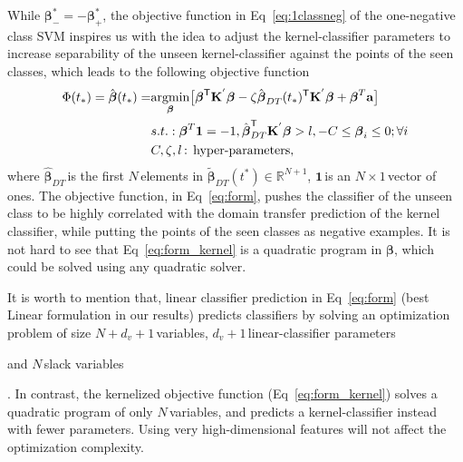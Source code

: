 \normalsize
While \small${\boldsymbol{\beta}}^*_{-}  = - {\boldsymbol{\beta}}^*_{+}$\normalsize, the objective function in Eq~\ref{eq:1classneg} of the one-negative class SVM inspires us with the idea to adjust the kernel-classifier parameters to increase separability of the unseen kernel-classifier against the points of the seen classes, which leads to the following objective function 
\small
\begin{equation}
\label{eq:form_kernel}
\small
\begin{split}
\Phi(t_*) = \hat{\boldsymbol{\beta}}(t_*) =  &   \underset{\boldsymbol{\beta}}{\operatorname{argmin }}\big[    \boldsymbol{\beta}^\textsf{T} \mathbf{K^{' }}\boldsymbol{\beta} - \zeta \hat{\boldsymbol{\beta}}_{DT}(t_*)^\textsf{T} \mathbf{K^{'}} \boldsymbol{\beta}   + \boldsymbol{\beta}^T \mathbf{a} \big]\\
&s.t.:   \boldsymbol{\beta}^T \mathbf{1} = -1, {\hat{\boldsymbol{\beta}}_{DT}}^{\mathsf{T}} \mathbf{K^{' }} \boldsymbol{\beta}> l, -C \le \boldsymbol{\beta}_i \le 0;\forall i \\
& C, \zeta , l \,  \text{: hyper-parameters},\\ 
\end{split}
\end{equation}
\normalsize
where  \small$\hat{\boldsymbol{\beta}}_{DT}\,$\normalsize is the first \small$N\,$\normalsize elements in \small$\tilde{\boldsymbol{\beta}}_{DT}(t^*) \in \mathbb{R}^{N+1}$\normalsize, \small$\mathbf{1}\,$\normalsize is an \small$N \times 1\,$\normalsize vector of ones. The objective function, in Eq~\ref{eq:form},  pushes the classifier of the unseen class to be highly correlated with the domain transfer prediction of the kernel classifier, while putting  the points of the seen classes as negative examples. It is not hard to see that Eq~\ref{eq:form_kernel} is a quadratic program in \small$\mathbf{\beta}$\normalsize, which could be solved using any quadratic solver.%
 It is worth to mention that,  linear classifier prediction in Eq~\ref{eq:form} (best Linear formulation in our results)  predicts  classifiers by solving an optimization problem of size  \small$N+d_v+1\,$\normalsize  variables, \small$d_v+1\,$\normalsize linear-classifier parameters and \small$N\,$\normalsize slack variables.  In contrast, the kernelized objective function (Eq~\ref{eq:form_kernel}) solves a  quadratic program of only \small$N\,$\normalsize variables, and  predicts a kernel-classifier instead with fewer parameters. Using very high-dimensional features  will not affect the optimization complexity.  

